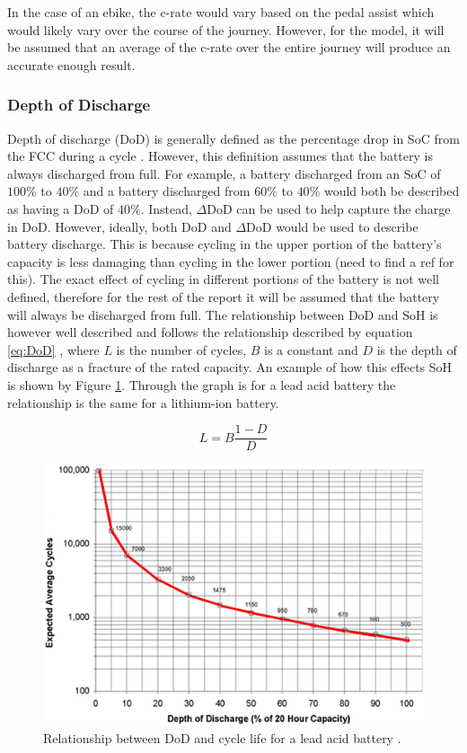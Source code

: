 \documentclass[a4paper, 10pt]{article}
\numberwithin{equation}{section}
\begin{document}
In the case of an ebike, the c-rate would vary based on the pedal assist which would likely vary over the course of the journey. However, for the model, it will be assumed that an average of the c-rate over the entire journey will produce an accurate enough result.

\subsubsection{Depth of Discharge} 
Depth of discharge (DoD) is generally defined as the percentage drop in SoC from the FCC during a cycle \cite{report:doddef}. However, this definition assumes that the battery is always discharged from full. For example, a battery discharged from an SoC of $100\%$ to $40\%$ and a battery discharged from $60\%$ to $40\%$ would both be described as having a DoD of $40\%$. Instead, $\Delta$DoD can be used to help capture the charge in DoD. However, ideally, both DoD and $\Delta$DoD would be used to describe battery discharge. This is because cycling in the upper portion of the battery's capacity is less damaging than cycling in the lower portion (need to find a ref for this). The exact effect of cycling in different portions of the battery is not well defined, therefore for the rest of the report it will be assumed that the battery will always be discharged from full. The relationship between DoD and SoH is however well described and follows the relationship described by equation \ref{eq:DoD} \cite{report:NASADoD}, where $L$ is the number of cycles, $B$ is a constant and $D$ is the depth of discharge as a fracture of the rated capacity. An example of how this effects SoH is shown by Figure \ref{fig:dod}. Through the graph is for a lead acid battery the relationship is the same for a lithium-ion battery.

\begin{equation}\label{eq:DoD}
L=B\frac{1-D}{D} 
\end{equation}

\begin{figure}[H]
    \centering
    \includegraphics[width=0.6\linewidth]{images/dod.png}
    \caption{Relationship between DoD and cycle life for a lead acid battery \cite{web:batt_life}.}
    \label{fig:dod}
\end{figure}
\end{document}
